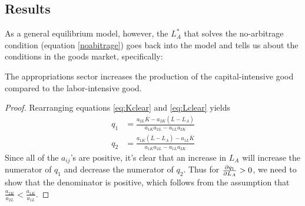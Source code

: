 \subsection*{Results}
As a general equilibrium model, however, the $L_A^*$ that solves the no-arbitrage condition (equation \ref{noabitrage}) goes back into the model and tells us about the conditions in the goods market, specifically:
\begin{proposition}
    The appropriations sector increases the production of the capital-intensive good compared to the labor-intensive good.
\end{proposition}
\begin{proof}
    Rearranging equations \ref{eq:Kclear} and \ref{eq:Lclear} yields
    \begin{align*}
        q_1 & = \frac{a_{2L}\bar{K} - a_{2K}(\bar{L} - L_A)}{a_{1K}a_{2L} - a_{1L}a_{2K}} \\ 
        q_2 & = \frac{a_{1K}(\bar{L} - L_A) - a_{1L}\bar{K}}{a_{1K}a_{2L} - a_{1L}a_{2K}}
    \end{align*}
    Since all of the $a_{ij}$'s are positive, it's clear that an increase in $L_A$ will increase the numerator of $q_1$ and decrease the numerator of $q_2$. Thus for $\frac{\partial q_1}{\partial L_A} > 0$, we need to show that the denominator is positive, which follows from the assumption that $\frac{a_{2K}}{a_{2L}} < \frac{a_{1K}}{a_{1L}}$.
\end{proof}

